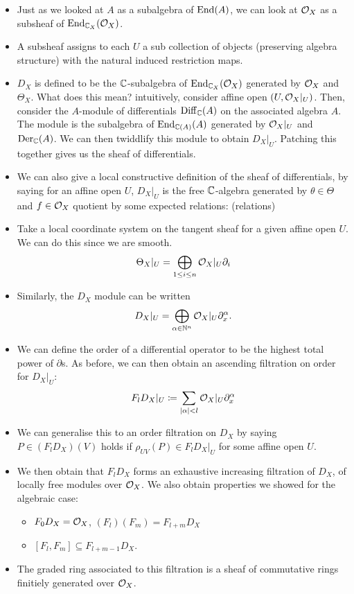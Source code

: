 \documentclass[a4paper]{article}
\def\Diff{\operatorname{Diff}}
\begin{document}
\begin{itemize}
    \item Just as we looked at $A$ as a subalgebra of $\operatorname{End}(A)$, we can look at $\mathcal{O}_X$ as a subsheaf of $\operatorname{End}_{\mathbb{C}_X}(\mathcal{O}_X)$.
    \item A subsheaf assigns to each $U$ a sub collection of objects (preserving algebra structure) with the natural induced restriction maps.
    \item $D_X$ is defined to be the $\mathbb{C}$-subalgebra of $\operatorname{End}_{\mathbb{C}_X}(\mathcal{O}_X)$ generated by $\mathcal{O}_X$ and $\Theta_X$. What does this mean? intuitively, consider affine open $(U, \mathcal{O}_X|_U)$. Then, consider the $A$-module of differentials $\Diff_\bC(A)$ on the associated algebra $A$. The module is the subalgebra of $\operatorname{End}_{\mathbb{C}(A)}(A)$ generated by $\mathcal{O}_X|_U$ and $\operatorname{Der}_{\mathbb{C}}(A)$. We can then twiddlify this module to obtain $D_X|_U$. Patching this together gives us the sheaf of differentials.
    \item We can also give a local constructive definition of the sheaf of differentials, by saying for an affine open $U$, $D_X|_U$ is the free $\mathbb{C}$-algebra generated by $\theta \in \Theta$ and $f \in \mathcal{O}_X$ quotient by some expected relations: (relations)
    \item Take a local coordinate system on the tangent sheaf for a given affine open $U$. We can do this since we are smooth.
        \[
            \Theta_X|_U = \bigoplus_{1\leq i \leq n} \mathcal{O}_X|_U \partial_i
        \]
    \item Similarly, the $D_X$ module can be written
        \[
            D_X|_U = \bigoplus_{\alpha \in \mathbb{N}^n} \mathcal{O}_X|_U \partial_x^\alpha.
        \]
    \item We can define the order of a differential operator to be the highest total power of $\partial$s. As before, we can then obtain an ascending filtration on order for $D_X|_U$:
        \[
            F_l D_X|_U \coloneqq \sum_{|\alpha| < l} \mathcal{O}_X|_U \partial_x^\alpha
        \]
    \item We can generalise this to an order filtration on $D_X$ by saying $P\in (F_lD_X)(V)$ holds if $\rho_{UV}(P) \in F_lD_X|_U$ for some affine open $U$.
    \item We then obtain that $F_l D_X$ forms an exhaustive increasing filtration of $D_X$, of locally free modules over $\mathcal{O}_X$. We also obtain properties we showed for the algebraic case:
        \begin{itemize}
            \item $F_0 D_X = \mathcal{O}_X$, $(F_l)(F_m) = F_{l+m}D_X$
            \item $[F_l, F_m] \subseteq F_{l+m-1} D_X$.
        \end{itemize}
    \item The graded ring associated to this filtration is a sheaf of commutative rings finitiely generated over $\mathcal{O}_X$.
\end{itemize}
\end{document}
